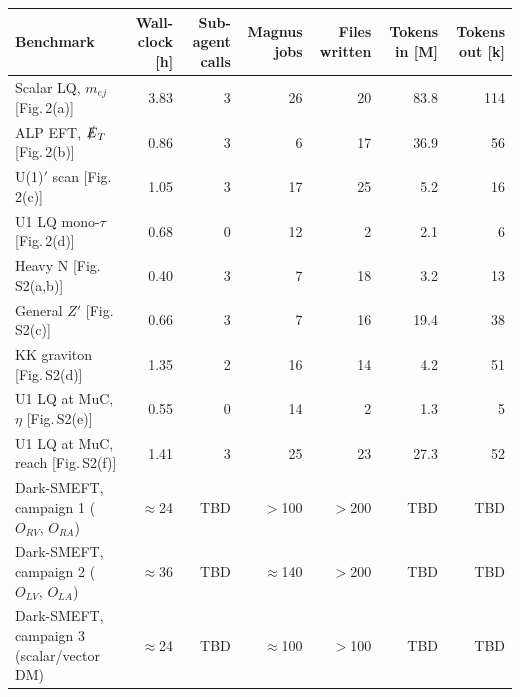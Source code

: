 \begin{tabular}{lrrrrrr}
\toprule
Benchmark & Wall-clock [h] & Sub-agent calls & Magnus jobs & Files written & Tokens in [M] & Tokens out [k] \\
\midrule
Scalar LQ, $m_{ej}$ [Fig.\,2(a)] & 3.83 & 3 & 26 & 20 & 83.8 & 114 \\
ALP EFT, $\slashed{E}_T$ [Fig.\,2(b)] & 0.86 & 3 & 6 & 17 & 36.9 & 56 \\
U(1)$'$ scan [Fig.\,2(c)] & 1.05 & 3 & 17 & 25 & 5.2 & 16 \\
U1 LQ mono-$\tau$ [Fig.\,2(d)] & 0.68 & 0 & 12 & 2 & 2.1 & 6 \\
Heavy N [Fig.\,S2(a,b)] & 0.40 & 3 & 7 & 18 & 3.2 & 13 \\
General $Z'$ [Fig.\,S2(c)] & 0.66 & 3 & 7 & 16 & 19.4 & 38 \\
KK graviton [Fig.\,S2(d)] & 1.35 & 2 & 16 & 14 & 4.2 & 51 \\
U1 LQ at MuC, $\eta$ [Fig.\,S2(e)] & 0.55 & 0 & 14 & 2 & 1.3 & 5 \\
U1 LQ at MuC, reach [Fig.\,S2(f)] & 1.41 & 3 & 25 & 23 & 27.3 & 52 \\
\midrule
Dark-SMEFT, campaign 1 ($O_{RV}$, $O_{RA}$) & $\approx$24 & TBD & $>$100 & $>$200 & TBD & TBD \\
Dark-SMEFT, campaign 2 ($O_{LV}$, $O_{LA}$) & $\approx$36 & TBD & $\approx$140 & $>$200 & TBD & TBD \\
Dark-SMEFT, campaign 3 (scalar/vector DM) & $\approx$24 & TBD & $\approx$100 & $>$100 & TBD & TBD \\
\bottomrule
\end{tabular}
